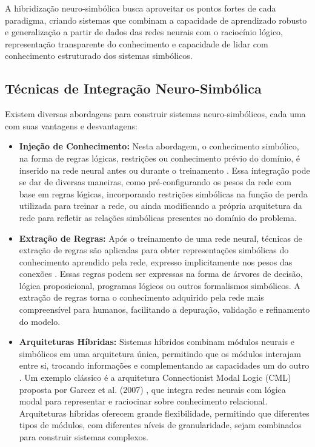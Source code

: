 \documentclass[12pt]{article}
\begin{document}
A hibridização neuro-simbólica busca aproveitar os pontos fortes de cada paradigma,  criando sistemas que combinam a capacidade de aprendizado robusto e generalização a partir de dados das redes neurais com o raciocínio lógico,  representação transparente do conhecimento e capacidade de lidar com conhecimento estruturado dos sistemas simbólicos.

\subsection{Técnicas de Integração Neuro-Simbólica}

Existem diversas abordagens para construir sistemas neuro-simbólicos, cada uma com suas vantagens e desvantagens:

\begin{itemize}
    \item \textbf{Injeção de Conhecimento:} Nesta abordagem, o conhecimento simbólico,  na forma de regras lógicas,  restrições ou conhecimento prévio do domínio,  é inserido na rede neural antes ou durante o treinamento \cite{hu2018harnessing}.  Essa integração pode se dar de diversas maneiras,  como pré-configurando os pesos da rede com base em regras lógicas,  incorporando restrições simbólicas na função de perda utilizada para treinar a rede,  ou ainda modificando a própria arquitetura da rede para refletir as relações simbólicas presentes no domínio do problema.
    \item \textbf{Extração de Regras:} Após o treinamento de uma rede neural,  técnicas de extração de regras são aplicadas para obter representações simbólicas do conhecimento aprendido pela rede,  expresso implicitamente nos pesos das conexões \cite{andrews1995survey}.  Essas regras podem ser expressas na forma de árvores de decisão,  lógica proposicional,  programas lógicos ou outros formalismos simbólicos.  A extração de regras torna o conhecimento adquirido pela rede mais compreensível para humanos,  facilitando a depuração,  validação e refinamento do modelo.
    \item \textbf{Arquiteturas Híbridas:} Sistemas híbridos combinam módulos neurais e simbólicos em uma arquitetura única,  permitindo que os módulos interajam entre si,  trocando informações e complementando as capacidades um do outro \cite{badreddine2020reinforcement}. Um exemplo clássico é a arquitetura Connectionist Modal Logic (CML) proposta por Garcez et al. (2007) \cite{garcez2007connectionist},  que integra redes neurais com lógica modal para representar e raciocinar sobre conhecimento relacional.  Arquiteturas híbridas oferecem grande flexibilidade,  permitindo que diferentes tipos de módulos,  com diferentes níveis de granularidade,  sejam combinados para construir sistemas complexos.
\end{itemize}
\end{document}
